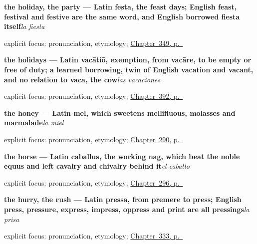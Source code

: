 \noindent\begin{minipage}[t]{\linewidth}
\raggedright
\textbf{the holiday, the party — Latin festa, the feast days; English feast, festival and festive are the same word, and English borrowed fiesta itself}\enspace\emph{la fiesta}\par
\footnotesize explicit focus: pronunciation, etymology; \hyperref[ch:la-jornada-y-la-decada]{Chapter~349, p.~\pageref*{ch:la-jornada-y-la-decada}}
\end{minipage}\par\smallskip

\noindent\begin{minipage}[t]{\linewidth}
\raggedright
\textbf{the holidays — Latin vacātiō, exemption, from vacāre, to be empty or free of duty; a learned borrowing, twin of English vacation and vacant, and no relation to vaca, the cow}\enspace\emph{las vacaciones}\par
\footnotesize explicit focus: pronunciation, etymology; \hyperref[ch:el-aeropuerto-y-las-vacaciones]{Chapter~392, p.~\pageref*{ch:el-aeropuerto-y-las-vacaciones}}
\end{minipage}\par\smallskip

\noindent\begin{minipage}[t]{\linewidth}
\raggedright
\textbf{the honey — Latin mel, which sweetens mellifluous, molasses and marmalade}\enspace\emph{la miel}\par
\footnotesize explicit focus: pronunciation, etymology; \hyperref[ch:lo-que-se-come]{Chapter~290, p.~\pageref*{ch:lo-que-se-come}}
\end{minipage}\par\smallskip

\noindent\begin{minipage}[t]{\linewidth}
\raggedright
\textbf{the horse — Latin caballus, the working nag, which beat the noble equus and left cavalry and chivalry behind it}\enspace\emph{el caballo}\par
\footnotesize explicit focus: pronunciation, etymology; \hyperref[ch:animales]{Chapter~296, p.~\pageref*{ch:animales}}
\end{minipage}\par\smallskip

\noindent\begin{minipage}[t]{\linewidth}
\raggedright
\textbf{the hurry, the rush — Latin pressa, from premere to press; English press, pressure, express, impress, oppress and print are all pressings}\enspace\emph{la prisa}\par
\footnotesize explicit focus: pronunciation, etymology; \hyperref[ch:calma-y-prisa]{Chapter~333, p.~\pageref*{ch:calma-y-prisa}}
\end{minipage}\par\smallskip

